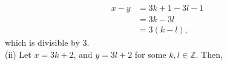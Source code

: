 \documentclass[12pt]{article}
\newcommand{\Z}{\mathbb{Z}}
\begin{document}
\begin{enumerate}
        \begin{equation*}
            \begin{split}
                x-y&=3k+1-3l-1\\
                &=3k-3l\\
                &=3(k-l),
            \end{split}
        \end{equation*}
        which is divisible by 3.\\ (ii) Let \(x=3k+2\), and \(y=3l+2\) for some \(k,l\in\Z\). Then,
        \begin{equation*}
            
        \end{equation*}
    \end{enumerate}
\end{document}
